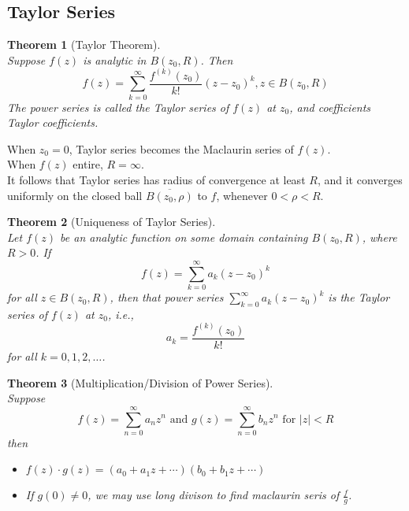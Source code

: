 \documentclass[12pt]{article}
\newtheorem{theorem}{Theorem}[section]
\theoremstyle{definition}
\begin{document}
\subsection{Taylor Series}
\begin{theorem}[Taylor Theorem]
\hfill\\\normalfont Suppose $f(z)$ is analytic in $B(z_0, R)$. Then
\[
f(z)=\sum_{k=0}^\infty \frac{f^{(k)}(z_0)}{k!}(z-z_0)^k, z\in B(z_0, R)
\]
The power series is called the Taylor series of $f(z)$ at $z_0$, and coefficients Taylor coefficients.
\end{theorem}
When $z_0 = 0$, Taylor series becomes the Maclaurin series of $f(z)$.\\
When $f(z)$ entire, $R=\infty$.\\
It follows that Taylor series has radius of convergence at least $R$, and it converges uniformly on the closed ball $\overline{B(z_0, \rho)}$ to $f$, whenever $0<\rho<R$.
\begin{theorem}[Uniqueness of Taylor Series]
\hfill\\\normalfont Let $f(z)$ be an analytic function on some domain containing $B(z_0, R)$, where $R>0$. If
\[
f(z)=\sum_{k=0}^\infty a_k(z-z_0)^k
\]
for all $z\in B(z_0, R)$, then that power series $\sum_{k=0}^\infty a_k (z-z_0)^k$ is the Taylor series of $f(z)$ at $z_0$, i.e.,
\[
a_k = \frac{f^{(k)}(z_0)}{k!}
\]
for all $k = 0,1,2,\ldots$.
\end{theorem}
\begin{theorem}[Multiplication/Division of Power Series]
\hfill\\\normalfont Suppose 
\[
f(z)=\sum_{n=0}^\infty a_nz^n \text{ and } g(z)=\sum_{n=0}^\infty b_nz^n \text{ for }|z|<R
\]
then
\begin{itemize}
	\item $f(z)\cdot g(z) = (a_0 + a_1z + \cdots) (b_0 + b_1z + \cdots)$
	\item If $g(0) \neq 0$, we may use long divison to find maclaurin seris of $\frac{f}{g}$.
\end{itemize}
\end{theorem}
\end{document}
